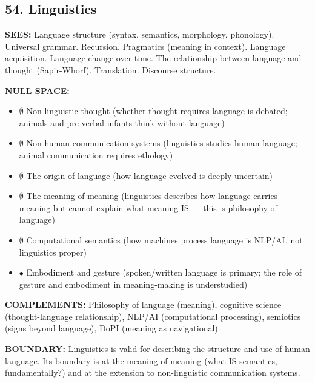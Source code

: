 \bigskip\noindent\makebox[\textwidth]{\color{rulegray}\rule{5cm}{0.3pt}}\bigskip


\subsection*{54. Linguistics}


\textbf{SEES:} Language structure (syntax, semantics, morphology, phonology). Universal grammar. Recursion. Pragmatics (meaning in context). Language acquisition. Language change over time. The relationship between language and thought (Sapir-Whorf). Translation. Discourse structure.


\textbf{NULL SPACE:}

\begin{itemize}[nosep,leftmargin=*]
  \item $\emptyset$ Non-linguistic thought (whether thought requires language is debated; animals and pre-verbal infants think without language)
  \item $\emptyset$ Non-human communication systems (linguistics studies human language; animal communication requires ethology)
  \item $\emptyset$ The origin of language (how language evolved is deeply uncertain)
  \item $\emptyset$ The meaning of meaning (linguistics describes how language carries meaning but cannot explain what meaning IS — this is philosophy of language)
  \item $\emptyset$ Computational semantics (how machines process language is NLP/\allowbreak AI, not linguistics proper)
  \item $\bullet$ Embodiment and gesture (spoken/\allowbreak written language is primary; the role of gesture and embodiment in meaning-making is understudied)
\end{itemize}


\textbf{COMPLEMENTS:} Philosophy of language (meaning), cognitive science (thought-language relationship), NLP/\allowbreak AI (computational processing), semiotics (signs beyond language), DoPI (meaning as navigational).


\textbf{BOUNDARY:} Linguistics is valid for describing the structure and use of human language. Its boundary is at the meaning of meaning (what IS semantics, fundamentally?) and at the extension to non-linguistic communication systems.


